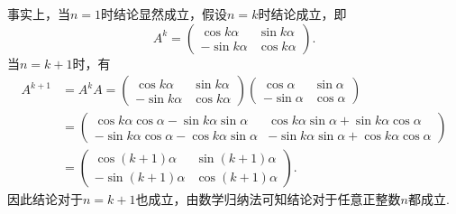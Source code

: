 \begin{enumerate}
          \begin{solution}
              事实上，当$n=1$时结论显然成立，假设$n=k$时结论成立，即
              \[A^k=\begin{pmatrix}\cos k\alpha & \sin k\alpha \\ -\sin k\alpha & \cos k\alpha\end{pmatrix}.\]
              当$n=k+1$时，有
              \begin{align*}
                  A^{k+1} & =A^kA=\begin{pmatrix}\cos k\alpha & \sin k\alpha \\ -\sin k\alpha & \cos k\alpha\end{pmatrix}\begin{pmatrix}\cos\alpha & \sin\alpha \\ -\sin\alpha & \cos\alpha\end{pmatrix}                                                  \\
                          & =\begin{pmatrix}\cos k\alpha\cos\alpha-\sin k\alpha\sin\alpha & \cos k\alpha\sin\alpha+\sin k\alpha\cos\alpha \\ -\sin k\alpha\cos\alpha-\cos k\alpha\sin\alpha & -\sin k\alpha\sin\alpha+\cos k\alpha\cos\alpha\end{pmatrix} \\
                          & =\begin{pmatrix}\cos(k+1)\alpha & \sin(k+1)\alpha \\ -\sin(k+1)\alpha & \cos(k+1)\alpha\end{pmatrix}.
              \end{align*}
              因此结论对于$n=k+1$也成立，由数学归纳法可知结论对于任意正整数$n$都成立.
          \end{solution}


\end{enumerate}
